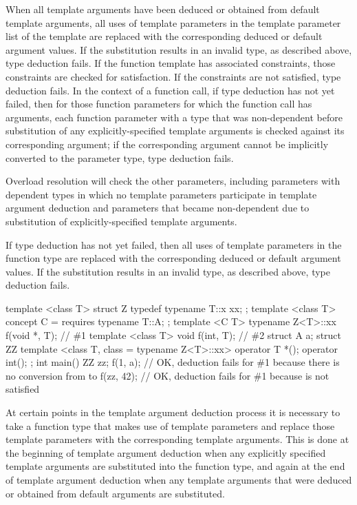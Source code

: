When all template arguments have been deduced or obtained from
default template arguments, all uses of template parameters in
the template parameter list of the template
are replaced with the corresponding deduced
or default argument values. If the substitution results in an
invalid type, as described above, type deduction fails.
If the function template has associated constraints,
those constraints are checked for satisfaction.
If the constraints are not satisfied, type deduction fails.
In the context of a function call, if type deduction has not yet failed, then
for those function parameters for which the function call has arguments,
each function parameter with a type that was non-dependent
before substitution of any explicitly-specified template arguments
is checked against its corresponding argument;
if the corresponding argument cannot be implicitly converted
to the parameter type, type deduction fails.
\begin{note}
Overload resolution will check the other parameters, including
parameters with dependent types in which
no template parameters participate in template argument deduction and
parameters that became non-dependent due to substitution of
explicitly-specified template arguments.
\end{note}
If type deduction has not yet failed, then
all uses of template parameters in the function type are
replaced with the corresponding deduced or default argument values.
If the substitution results in an invalid type, as described above,
type deduction fails.
\begin{example}
\begin{codeblock}
template <class T> struct Z {
  typedef typename T::x xx;
};
template <class T> concept C = requires { typename T::A; };
template <C T> typename Z<T>::xx f(void *, T);          // \#1
template <class T> void f(int, T);                      // \#2
struct A {} a;
struct ZZ {
  template <class T, class = typename Z<T>::xx> operator T *();
  operator int();
};
int main() {
  ZZ zz;
  f(1, a);              // OK, deduction fails for \#1 because there is no conversion from  to 
  f(zz, 42);            // OK, deduction fails for \#1 because  is not satisfied
}
\end{codeblock}
\end{example}

\pnum
At certain points in the template argument deduction process it is necessary
to take a function type that makes use of template parameters and replace those
template parameters with the corresponding template arguments. This is done at
the beginning of template argument deduction when any explicitly specified
template arguments are substituted into the function type, and again at the end
of template argument deduction when any template arguments that were deduced or
obtained from default arguments are substituted.

